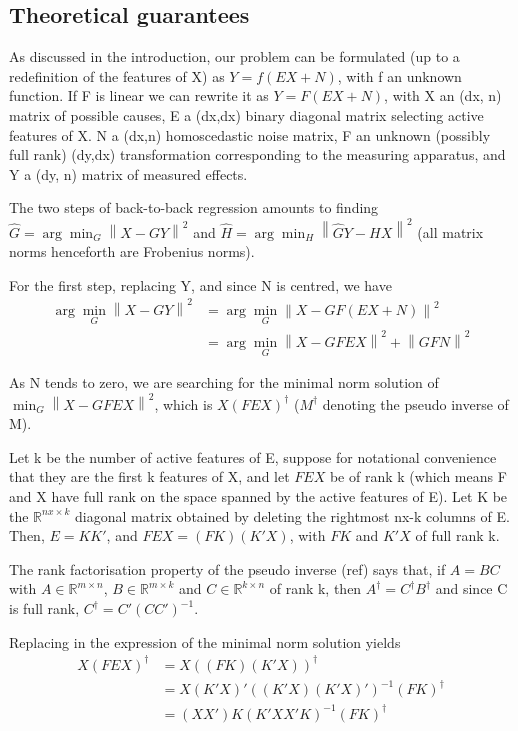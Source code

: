 \documentclass{article}
\begin{document}
\subsection{Theoretical guarantees}
As discussed in the introduction, our problem can be formulated (up to a redefinition of the features of X) as $Y=f(EX+N)$, with f an unknown function.
%
If F is linear we can rewrite it as $Y = F(EX + N)$, with X an (dx, n) matrix of possible causes, E a (dx,dx) binary diagonal matrix selecting active features of X.
%
N a (dx,n) homoscedastic noise matrix, F an unknown (possibly full rank) (dy,dx) transformation corresponding to the measuring apparatus, and Y a (dy, n) matrix of measured effects.

The two steps of back-to-back regression amounts to finding $\hat G=\arg \min_G \left \| X-GY \right \|^2$ and $\hat H =\arg \min_H \left \| \hat GY - HX \right \|^2$ (all matrix norms henceforth are Frobenius norms).

For the first step, replacing Y, and since N is centred, we have
\begin{equation}
\begin{aligned}
\arg \min_G \left \| X-GY \right \|^2 &= \arg \min_G \left \| X - GF(EX+N)\right\|^2 \\
&{}= \arg \min_G \left \| X-GFEX\right\| ^2  + \left \| GFN\right \| ^2
\end{aligned}
\end{equation}

As N tends to zero, we are searching for the minimal norm solution of $\min_G \left \| X-GFEX\right\| ^2$, which is $X(FEX)^\dagger$ ($M^\dagger$ denoting the pseudo inverse of M).

Let k be the number of active features of E, suppose for notational convenience that they are the first k features of X, and let $FEX$ be of rank k (which means F and X have full rank on the space spanned by the active features of E). Let K be the $\mathbb{R}^{nx\times k}$ diagonal matrix obtained by deleting the rightmost nx-k columns of E. Then, $E=KK'$, and $FEX=(FK)(K'X)$, with $FK$  and $K'X$ of full rank k.

The rank factorisation property of the pseudo inverse (ref) says that, if $A=BC$ with $A\in\mathbb{R}^{m\times n}$, $B\in\mathbb{R}^{m\times k}$ and $C\in\mathbb{R}^{k\times n}$ of rank k, then $A^\dagger=C^\dagger B^\dagger$ and since C is full rank, $C^\dagger=C' (CC')^{-1}$.

Replacing in the expression of the minimal norm solution yields
\begin{equation}
\begin{aligned}
X(FEX)^\dagger &=X((FK)(K'X))^\dagger \\
&=X(K'X)'((K'X)(K'X)')^{-1}(FK)^\dagger \\
&=(XX')K(K'XX'K)^{-1}(FK)^\dagger 
\end{aligned}
\end{equation}
\end{document}
